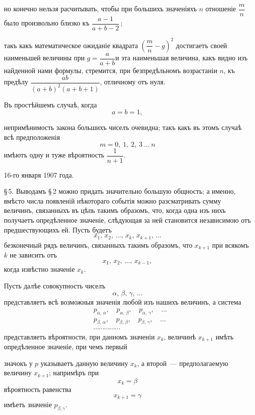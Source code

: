 \documentclass[12pt]{article}
\begin{document}
но конечно нельзя расчитывать, чтобы при большихъ значеніяхъ $n$ отношеніе $\dfrac{m}{n}$ было произвольно близко къ $\dfrac{a - 1}{a + b - 2}$\,;

такъ какъ математическое ожиданіе квадрата $\left(\dfrac{m}{n} - g\right)^{\!2}$ достигаетъ своей наименьшей величины при $g = \dfrac{a}{a+b}$\quad и эта наименьшая величина, какъ видно изъ найденной нами формулы, стремится, при безпредѣльномъ возрастаніи $n$, къ предѣлу $\dfrac{ab}{(a+b)^2(a+b+1)}$, отличному отъ нуля.

Въ простѣйшемъ случаѣ, когда
\[
a = b = 1,
\]


\noindent непримѣнимость закона большихъ чиселъ очевидна; такъ какъ въ этомъ случаѣ всѣ предположенія
\[
m = 0,\ 1,\ 2,\ 3\ \ldots\ n
\]
имѣютъ одну и туже вѣроятность $\dfrac{1}{n+1}$.

\begin{flushright}
16-го января 1907 года.
\end{flushright}

\medskip

\S\,5. Выводамъ \S\,2 можно придать значительно большую общность; а именно, вмѣсто числа появленій нѣкотораго событія можно разсматривать сумму величинъ, связанныхъ въ цѣпь такимъ образомъ, что, когда одна изъ нихъ получаетъ опредѣленное значеніе, слѣдующая за ней становится независимою отъ предшествующихъ ей. Пусть будетъ
\[
x_1,\, x_2,\, \ldots,\, x_k,\, x_{k+1},\, \ldots
\]
безконечный рядъ величинъ, связанныхъ такимъ образомъ, что $x_{k+1}$ при всякомъ $k$ не зависитъ отъ
\[
x_1,\, x_2,\, \ldots,\, x_{k-1},
\]
когда извѣстно значеніе $x_k$.

Пусть далѣе совокупность чиселъ
\[
\alpha,\, \beta,\, \gamma,\, \ldots
\]
представляетъ всѣ возможныя значенія любой изъ нашихъ величинъ, а система
\begin{align*}
&p_{\alpha,\,\alpha},\quad p_{\alpha,\,\beta},\quad p_{\alpha,\,\gamma},\quad \ldots \\
&p_{\beta,\,\alpha},\quad p_{\beta,\,\beta},\quad p_{\beta,\,\gamma},\quad \ldots \\
&\cdots\cdots\cdots\cdots\cdots
\end{align*}
представляетъ вѣроятности, при данномъ значеніи $x_k$, величинѣ $x_{k+1}$ имѣть опредѣленное значеніе, при чемъ первый


значокъ у $p$ указываетъ данную величину $x_k$, а второй~---
предполагаемую величину $x_{k+1}$; напримѣръ при
\[
x_k = \beta
\]
вѣроятность равенства
\[
x_{k+1} = \gamma
\]
имѣетъ значеніе $p_{\beta,\gamma}$.
\end{document}
